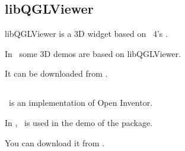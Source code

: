 






\subsection{libQGLViewer \label{thirdparty:libQGLViewer}}

libQGLViewer is a 3D widget based on \qt~4's .

In \cgal\ some 3D demos are based on libQGLViewer. 

It can be downloaded from \libqglviewerpage.

\subsection{\coin \label{thirdparty:Coin3D}}

\coin\ is an implementation of Open Inventor.  

In \cgal, \coin\ is used in the demo
of the  package. 

You can download it from \coinpage.

\subsection{\esbtl \label{thirdparty:ESBTL}}

